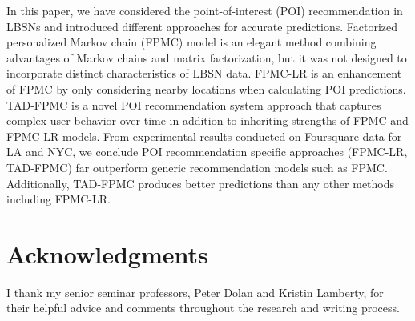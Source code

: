 \documentclass{sig-alternate}
\begin{document}
In this paper, we have considered the point-of-interest (POI) recommendation in LBSNs 
and introduced different approaches for accurate predictions. Factorized personalized Markov 
chain (FPMC) model is an elegant method combining advantages of Markov chains and matrix factorization,
but it was not designed to incorporate distinct characteristics of LBSN data. FPMC-LR is an enhancement 
of FPMC by only considering nearby locations when calculating POI predictions. TAD-FPMC is a novel 
POI recommendation system approach that captures complex user behavior over time in addition to inheriting strengths 
of FPMC and FPMC-LR models. From experimental results conducted on Foursquare data for LA and NYC, we conclude 
POI recommendation specific approaches (FPMC-LR, TAD-FPMC) far outperform generic recommendation models such as FPMC.
Additionally, TAD-FPMC produces better predictions than any other methods including FPMC-LR.


\section*{Acknowledgments}
\label{sec:acknowledgments}

I thank my senior seminar professors, Peter Dolan and Kristin Lamberty, 
for their helpful advice and comments throughout the research and writing process.



  
\end{document}
